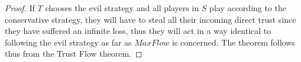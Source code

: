 \begin{proof}
  If $T$ chooses the evil strategy and all players in $S$ play according to the conservative strategy, they will have
  to steal all their incoming direct trust since they have suffered an infinite loss, thus they will act in a way
  identical to following the evil strategy as far as $MaxFlow$ is concerned. The theorem follows thus from the Trust
  Flow theorem.
\end{proof}

